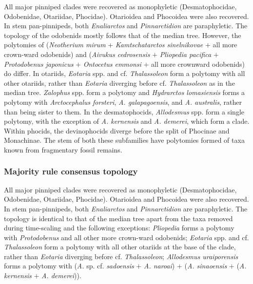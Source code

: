\documentclass[a4paper, 12pt]{article}
\begin{document}
All major pinniped clades were recovered as monophyletic (Desmatophocidae, Odobenidae, Otariidae, Phocidae). Otarioidea and Phocoidea were also recovered. In stem pan-pinnipeds, both \textit{Enaliarctos} and \textit{Pinnarctidion} are paraphyletic. The topology of the odobenids mostly follows that of the median tree. However, the polytomies of (\textit{Neotherium mirum} + \textit{Kamtschatarctos sinelnikovae} $+$ all more crown-ward odobenids) and (\textit{Aivukus cedrosensis} $+$ \textit{Pliopedia pacifica} $+$ \textit{Protodobenus japonicus} $+$ \textit{Ontocetus emmonsi} $+$ all more crownward odobenids) do differ. In otariids, \textit{Eotaria} spp. and cf. \textit{Thalassoleon} form a polytomy with all other otariids, rather than \textit{Eotaria} diverging before cf. \textit{Thalassoleon} as in the median tree. \textit{Zalophus} spp. form a polytomy and \textit{Hydrarctos lomasiensis} forms a polytomy with \textit{Arctocephalus forsteri}, \textit{A. galapagoensis}, and \textit{A. australis}, rather than being sister to them. In the desmatophocids, \textit{Allodesmus} spp. form a single polytomy, with the exception of \textit{A. kernensis} and \textit{A. demerei}, which form a clade. Within phocids, the devinophocids diverge before the split of Phocinae and Monachinae. The stem of both these subfamilies have polytomies formed of taxa known from fragmentary fossil remains.


\subsubsection{Majority rule consensus topology}

All major pinniped clades were recovered as monophyletic (Desmatophocidae, Odobenidae, Otariidae, Phocidae). Otarioidea and Phocoidea were also recovered. In stem pan-pinnipeds, both \textit{Enaliarctos} and \textit{Pinnarctidion} are paraphyletic. The topology is identical to that of the median tree apart from the taxa removed during time-scaling and the following exceptions: \textit{Pliopedia} forms a polytomy with \textit{Protodobenus} and all other more crown-ward odobenids; \textit{Eotaria} spp. and cf. \textit{Thalassoleon} form a polytomy with all other otariids at the base of the clade, rather than \textit{Eotaria} diverging before cf. \textit{Thalassoleon}; \textit{Allodesmus uraiporensis} forms a polytomy with (\textit{A.} sp. cf. \textit{sadoensis} $+$ \textit{A. naroai}) $+$ (\textit{A. sinaoensis} $+$ (\textit{A. kernensis} $+$ \textit{A. demerei})).
\end{document}
